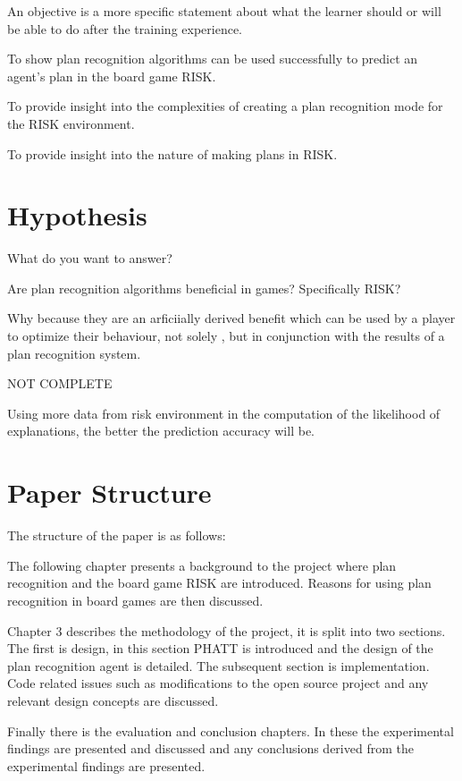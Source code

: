 \documentclass[parskip]{cs4rep}
\begin{document}
An objective is a more specific statement about what the learner should or will be able to do after the training experience.

To show plan recognition algorithms can be used successfully to predict an agent's plan in the board game RISK.

To provide insight into the complexities of creating a plan recognition mode for the RISK environment.

To provide insight into the nature of making plans in RISK. 

\section{Hypothesis}

What do you want to answer?

Are plan recognition algorithms beneficial in games? Specifically RISK?


Why because they are an arficiially derived benefit which can be used by a player to optimize their behaviour, not solely , but in conjunction with the results of a plan recognition system.

NOT COMPLETE

Using more data from risk environment in the computation of the likelihood of explanations, the better the prediction accuracy will be.

\section{Paper Structure}

The structure of the paper is as follows:

The following chapter presents a background to the project where plan recognition and the board game RISK are introduced. Reasons for using plan recognition in board games are then discussed.

Chapter 3 describes the methodology of the project, it is split into two sections. The first is design, in this section PHATT is introduced and the design of the plan recognition agent is detailed. The subsequent section is implementation. Code related issues such as modifications to the open source project and any relevant design concepts are discussed. 

Finally there is the evaluation and conclusion chapters. In these the experimental findings are presented and discussed and any conclusions derived from the experimental findings are presented.
\end{document}
